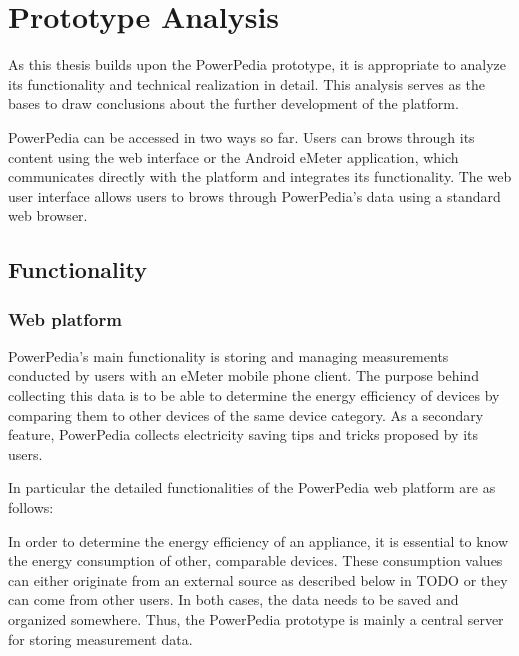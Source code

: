 \section{Prototype Analysis} \label{sec:prototype_analysis}
As this thesis builds upon the PowerPedia prototype, it is appropriate to analyze its functionality and technical realization in detail. This analysis serves as the bases to draw conclusions about the further development of the platform. 

PowerPedia can be accessed in two ways so far. Users can brows through its content using the web interface or the Android eMeter application, which communicates directly with the platform and integrates its functionality. The web user interface allows users to brows through PowerPedia's data using a standard web browser.
     

\subsection{Functionality}
\subsubsection{Web platform}
PowerPedia's main functionality is storing and managing measurements conducted by users with an eMeter mobile phone client. 
The purpose behind collecting this data is to be able to determine the energy efficiency of devices by comparing them to other devices of the same device category. As a secondary feature, PowerPedia collects electricity saving tips and tricks proposed by its users.

In particular the detailed functionalities of the PowerPedia web platform are as follows:

In order to determine the energy efficiency of an appliance, it is essential to know the energy consumption of other, comparable devices. These consumption values can either originate from an external source as described below in TODO or they can come from other users. In both cases, the data needs to be saved and organized somewhere. Thus, the PowerPedia prototype is mainly a central server for storing measurement data. 

